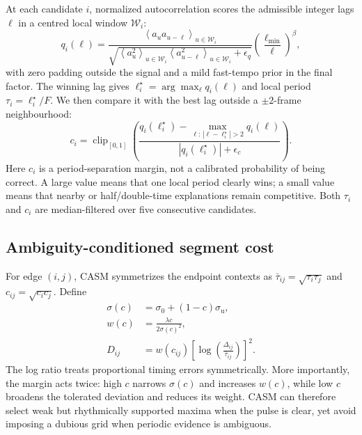 \documentclass{article}
\begin{document}
At each candidate $i$, normalized autocorrelation scores the admissible integer
lags $\ell$ in a centred local window $\mathcal W_i$:
\begin{equation}
q_i(\ell)=
\frac{\left\langle a_u a_{u-\ell}\right\rangle_{u\in\mathcal W_i}}
{\sqrt{\left\langle a_u^2\right\rangle_{u\in\mathcal W_i}
       \left\langle a_{u-\ell}^2\right\rangle_{u\in\mathcal W_i}
       +\epsilon_q}}
\left(\frac{\ell_{\min}}{\ell}\right)^{\beta},
\label{eq:casm-local-period}
\end{equation}
with zero padding outside the signal and a mild fast-tempo prior in the final
factor. The winning lag gives $\ell_i^\star=\arg\max_\ell q_i(\ell)$ and local
period $\tau_i=\ell_i^\star/F$. We then compare it with the best lag outside a
$\pm2$-frame neighbourhood:
\begin{equation}
c_i=\operatorname{clip}_{[0,1]}\!\left(
\frac{q_i(\ell_i^\star)-
\max_{\ell:\,|\ell-\ell_i^\star|>2}q_i(\ell)}
{|q_i(\ell_i^\star)|+\epsilon_c}\right).
\label{eq:casm-reliability}
\end{equation}
Here $c_i$ is a period-separation margin, not a calibrated probability of being
correct. A large value means that one local period clearly wins; a small value
means that nearby or half/double-time explanations remain competitive. Both
$\tau_i$ and $c_i$ are median-filtered over five consecutive candidates.

\subsection{Ambiguity-conditioned segment cost}

For edge $(i,j)$, CASM symmetrizes the endpoint contexts as
$\bar\tau_{ij}=\sqrt{\tau_i\tau_j}$ and $c_{ij}=\sqrt{c_i c_j}$. Define
\begin{equation}
\begin{aligned}
\sigma(c)&=\sigma_0+(1-c)\sigma_{\mathrm u}, \\
w(c)&=\frac{\lambda c}{2\sigma(c)^2}, \\
D_{ij}&=w(c_{ij})
\left[\log\!\left(\frac{\Delta_{ij}}{\bar\tau_{ij}}\right)\right]^2.
\end{aligned}
\label{eq:casm-duration}
\end{equation}
The log ratio treats proportional timing errors symmetrically. More
importantly, the margin acts twice: high $c$ narrows $\sigma(c)$ and increases
$w(c)$, while low $c$ broadens the tolerated deviation and reduces its weight.
CASM can therefore select weak but rhythmically supported maxima when the pulse
is clear, yet avoid imposing a dubious grid when periodic evidence is
ambiguous.
\end{document}
